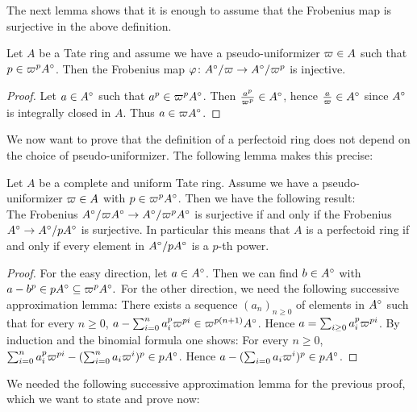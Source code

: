 The next lemma shows that it is enough to assume that the Frobenius map is surjective in the above definition.

\begin{lemma}
Let $A$ be a Tate ring and assume we have a pseudo-uniformizer $\varpi\in A$ such that $p\in\varpi^{p}A{^{\circ}}$. Then the Frobenius map 
$\varphi\colon A{^{\circ}}/\varpi\to A{^{\circ}}/\varpi^p$ is injective.
\end{lemma}
\begin{proof}
Let $a\in A{^{\circ}}$ such that $a^p\in\varpi^{p}A{^{\circ}}$. Then $\frac{a^p}{\varpi^p}\in A{^{\circ}}$, hence $\frac{a}{\varpi}\in A{^{\circ}}$ since $A{^{\circ}}$ is integrally closed in $A$.
Thus $a\in\varpi A{^{\circ}}$.
\end{proof}

We now want to prove that the definition of a perfectoid ring does not depend on the choice of pseudo-uniformizer. The following lemma makes this precise:
\begin{lemma}\label{perfringequivdeflemma}
Let $A$ be a complete and uniform Tate ring. Assume we have a pseudo-uniformizer $\varpi\in A$ with $p\in\varpi^pA{^{\circ}}$.
Then we have the following result:\\
The Frobenius $A{^{\circ}}/\varpi A{^{\circ}}\to A{^{\circ}}/\varpi^pA{^{\circ}}$ is surjective if and only if the Frobenius\\ $A{^{\circ}}\to A{^{\circ}}/pA{^{\circ}}$ is surjective.
In particular this means that $A$ is a perfectoid ring if and only if every element in $A{^{\circ}}/pA{^{\circ}}$ is a $p$-th power.
\end{lemma}
\begin{proof}
For the easy direction, let $a\in A{^{\circ}}$. Then we can find $b\in A{^{\circ}}$ with $a-b^p\in pA{^{\circ}}\subseteq\varpi^pA{^{\circ}}.$ 
For the other direction, we need the following successive approximation lemma:
There exists a sequence $(a_n)_{n\geq0}$ of elements in $A{^{\circ}}$ such that for every $n\geq0$, $a-\sum_{i=0}^{n}a_i^p\varpi^{pi}\in\varpi^{p(n+1)}A{^{\circ}}$. Hence $a=\sum_{i\geq0}a_i^p\varpi^{pi}$.
By induction and the binomial formula one shows: For every $n\geq0$, $\sum_{i=0}^{n}a_i^p\varpi^{pi}-(\sum_{i=0}^{n}a_i\varpi^{i})^p\in pA{^{\circ}}$. Hence $a-(\sum_{i=0}a_i\varpi^{i})^p\in pA{^{\circ}}$.
\end{proof}


We needed the following successive approximation lemma for the previous proof, which we want to state and prove now:

